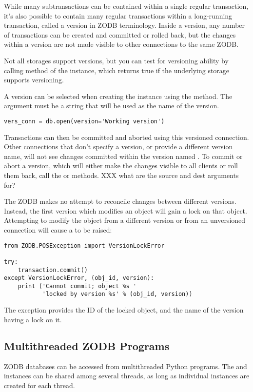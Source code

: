 While many subtransactions can be contained within a single regular
transaction, it's also possible to contain many regular transactions
within a long-running transaction, called a version in ZODB
terminology.  Inside a version, any number of transactions can be
created and committed or rolled back, but the changes within a version
are not made visible to other connections to the same ZODB.

Not all storages support versions, but you can test for versioning
ability by calling  method of the
 instance, which returns true if the underlying storage
supports versioning.

A version can be selected when creating the 
instance using the  method.
The  argument must be a string that will be used as the
name of the version.

\begin{verbatim}
vers_conn = db.open(version='Working version')
\end{verbatim}

Transactions can then be committed and aborted using this versioned
connection.  Other connections that don't specify a version, or
provide a different version name, will not see changes committed
within the version named .  To commit or abort a
version, which will either make the changes visible to all clients or
roll them back, call the  or
 methods.
XXX what are the source and dest arguments for?

The ZODB makes no attempt to reconcile changes between different
versions.  Instead, the first version which modifies an object will
gain a lock on that object.  Attempting to modify the object from a
different version or from an unversioned connection will cause a
 to be raised:

\begin{verbatim}
from ZODB.POSException import VersionLockError

try:
    transaction.commit()
except VersionLockError, (obj_id, version):
    print ('Cannot commit; object %s '
           'locked by version %s' % (obj_id, version))
\end{verbatim}

The exception provides the ID of the locked object, and the name of
the version having a lock on it.

\subsection{Multithreaded ZODB Programs}

ZODB databases can be accessed from multithreaded Python programs.
The  and  instances can be shared among
several threads, as long as individual  instances
are created for each thread.

